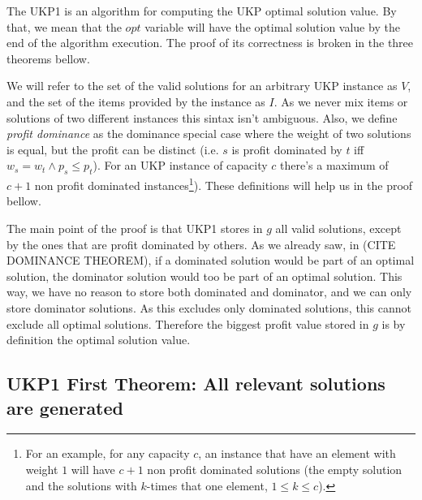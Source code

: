 \documentclass[12pt]{article}
\begin{document}
The UKP1 is an algorithm for computing the UKP optimal solution value. By that, we mean that the \(opt\) variable will have the optimal solution value by the end of the algorithm execution. The proof of its correctness is broken in the three theorems bellow.

We will refer to the set of the valid solutions for an arbitrary UKP instance as \(V\), and the set of the items provided by the instance as \(I\). As we never mix items or solutions of two different instances this sintax isn't ambiguous. Also, we define \textit{profit dominance} as the dominance special case where the weight of two solutions is equal, but the profit can be distinct (i.e. \(s\) is profit dominated by \(t\) iff \(w_s = w_t \land p_s \leq p_t\)). For an UKP instance of capacity \(c\) there's a maximum of \(c+1\) non profit dominated instances\footnote{For an example, for any capacity \(c\), an instance that have an element with weight \(1\) will have \(c+1\) non profit dominated solutions (the empty solution and the solutions with \(k\)-times that one element, \(1 \leq k \leq c\)).}). These definitions will help us in the proof bellow.

The main point of the proof is that UKP1 stores in \(g\) all valid solutions, except by the ones that are profit dominated by others. As we already saw, in (CITE DOMINANCE THEOREM), if a dominated solution would be part of an optimal solution, the dominator solution would too be part of an optimal solution. This way, we have no reason to store both dominated and dominator, and we can only store dominator solutions. As this excludes only dominated solutions, this cannot exclude all optimal solutions. Therefore the biggest profit value stored in \(g\) is by definition the optimal solution value.

\subsection{UKP1 First Theorem: All relevant solutions are generated}

\end{document}
